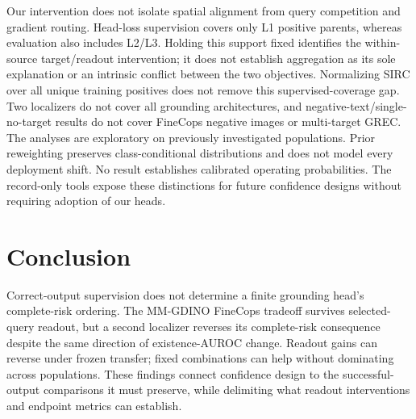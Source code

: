 \documentclass[10pt,twocolumn,letterpaper]{article}
\begin{document}
Our intervention does not isolate spatial alignment from query competition
and gradient routing. Head-loss supervision covers only L1 positive
parents, whereas evaluation also includes L2/L3. Holding this support
fixed identifies the within-source target/readout intervention; it does
not establish aggregation as its sole explanation or an intrinsic
conflict between the two objectives. Normalizing SIRC over all unique
training positives does not remove this supervised-coverage gap.
Two localizers do not cover all grounding
architectures, and negative-text/single-no-target results do not cover
FineCops negative images or multi-target GREC. The analyses are exploratory
on previously investigated populations. Prior reweighting preserves
class-conditional distributions and does not model every deployment
shift. No result establishes calibrated operating probabilities.
The record-only tools expose these distinctions for future confidence
designs without requiring adoption of our heads.

\section{Conclusion}
Correct-output supervision does not determine a finite grounding head's
complete-risk ordering. The MM-GDINO FineCops tradeoff survives selected-query
readout, but a second localizer reverses its complete-risk consequence
despite the same direction of existence-AUROC change. Readout gains can
reverse under frozen transfer; fixed combinations can help without
dominating across populations. These findings connect confidence design
to the successful-output comparisons it must preserve, while delimiting
what readout interventions and endpoint metrics can establish.

\FloatBarrier
{\small}
\end{document}
